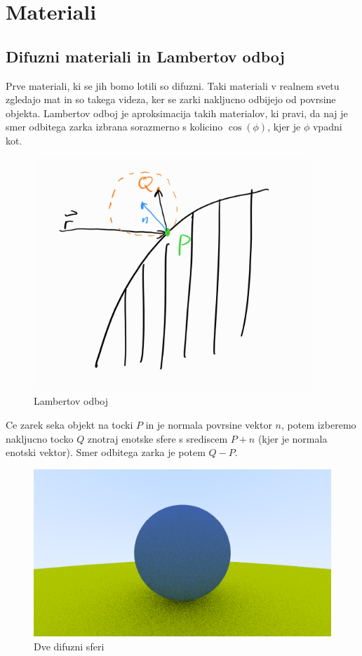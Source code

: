\documentclass[12pt, a4paper]{article}
\begin{document}
\section{Materiali}

\subsection{Difuzni materiali in Lambertov odboj}

Prve materiali, ki se jih bomo lotili so difuzni. Taki materiali v realnem svetu zgledajo mat in so takega
videza, ker se zarki nakljucno odbijejo od povrsine objekta. Lambertov odboj je aproksimacija takih materialov,
ki pravi, da naj je smer odbitega zarka izbrana sorazmerno s kolicino $\cos (\phi) $, kjer je $\phi$ vpadni
kot.

\begin{figure}[h]
	\centering
	\includegraphics[height=250pt]{shema_difzuni}
	\caption{Lambertov odboj}
\end{figure}

Ce zarek seka objekt na tocki $P$ in je normala povrsine vektor $n$, potem izberemo nakljucno tocko $Q$
znotraj enotske sfere s srediscem $P + n$ (kjer je normala enotski vektor). Smer odbitega zarka je potem
$Q - P$.

\begin{figure}[h]
	\centering
	\includegraphics[width=400pt]{difuzni}
	\caption{Dve difuzni sferi}
\end{figure}
\end{document}
